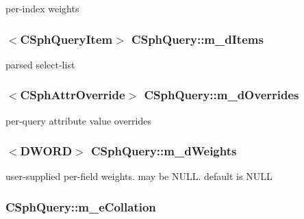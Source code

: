 per-\/index weights 

\hypertarget{classCSphQuery_a7d256ea9cf0ed85d7da6111537f02f50}{
\subsubsection[{m\-\_\-d\-Items}]{$<${\bf C\-Sph\-Query\-Item}$>$ C\-Sph\-Query\-::m\-\_\-d\-Items}}\label{classCSphQuery_a7d256ea9cf0ed85d7da6111537f02f50}


parsed select-\/list 

\hypertarget{classCSphQuery_ab2f5d9d2129f4916c24df3b7ce34a08a}{
\subsubsection[{m\-\_\-d\-Overrides}]{$<${\bf C\-Sph\-Attr\-Override}$>$ C\-Sph\-Query\-::m\-\_\-d\-Overrides}}\label{classCSphQuery_ab2f5d9d2129f4916c24df3b7ce34a08a}


per-\/query attribute value overrides 

\hypertarget{classCSphQuery_a691bd7f7c26b1ba472448961724306d0}{
\subsubsection[{m\-\_\-d\-Weights}]{$<${\bf D\-W\-O\-R\-D}$>$ C\-Sph\-Query\-::m\-\_\-d\-Weights}}\label{classCSphQuery_a691bd7f7c26b1ba472448961724306d0}


user-\/supplied per-\/field weights. may be N\-U\-L\-L. default is N\-U\-L\-L 

\hypertarget{classCSphQuery_a58cef95cb041643d36d29e8109aa5ebf}{
\subsubsection[{m\-\_\-e\-Collation}]{ C\-Sph\-Query\-::m\-\_\-e\-Collation}}\label{classCSphQuery_a58cef95cb041643d36d29e8109aa5ebf}



